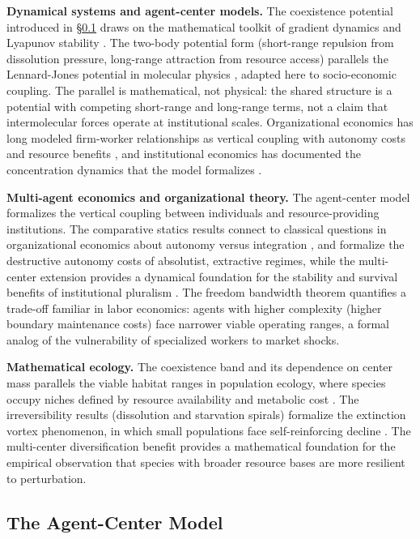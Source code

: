 \documentclass[11pt]{article}
\theoremstyle{plain}
\theoremstyle{definition}
\theoremstyle{remark}
\let\origsubsection\subsection
\renewcommand{\subsection}{\needspace{7\baselineskip}\origsubsection}
\begin{document}
\textbf{Dynamical systems and agent-center models.} The coexistence
potential introduced in §\ref{the-agent-center-model} draws on the
mathematical toolkit of gradient dynamics and Lyapunov stability
\citep{Strogatz2015, HirschSmaleDevaney2012}. The two-body potential
form (short-range repulsion from dissolution pressure, long-range
attraction from resource access) parallels the Lennard-Jones potential
in molecular physics \citep{Jones1924}, adapted here to socio-economic
coupling. The parallel is mathematical, not physical: the shared
structure is a potential with competing short-range and long-range
terms, not a claim that intermolecular forces operate at institutional
scales. Organizational economics has long modeled firm-worker
relationships as vertical coupling with autonomy costs and resource
benefits \citep{Tirole1988}, and institutional economics has documented
the concentration dynamics that the model formalizes
\citep{AcemogluRobinson2012}.

\textbf{Multi-agent economics and organizational theory.} The
agent-center model formalizes the vertical coupling between individuals
and resource-providing institutions. The comparative statics results
connect to classical questions in organizational economics about
autonomy versus integration \citep{Tirole1988}, and formalize the
destructive autonomy costs of absolutist, extractive regimes, while the
multi-center extension provides a dynamical foundation for the stability
and survival benefits of institutional pluralism
\citep{AcemogluRobinson2012}. The freedom bandwidth theorem quantifies a
trade-off familiar in labor economics: agents with higher complexity
(higher boundary maintenance costs) face narrower viable operating
ranges, a formal analog of the vulnerability of specialized workers to
market shocks.

\textbf{Mathematical ecology.} The coexistence band and its dependence
on center mass parallels the viable habitat ranges in population
ecology, where species occupy niches defined by resource availability
and metabolic cost \citep{Tilman1982}. The irreversibility results
(dissolution and starvation spirals) formalize the extinction vortex
phenomenon, in which small populations face self-reinforcing decline
\citep{Gilpin1986}. The multi-center diversification benefit provides a
mathematical foundation for the empirical observation that species with
broader resource bases are more resilient to perturbation.

\subsection{The Agent-Center Model}\label{the-agent-center-model}
\end{document}
